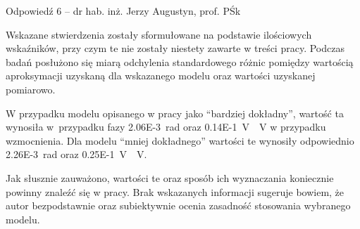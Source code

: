 \documentclass[12pt, polish, aspectratio = 169]{slides}
\begin{document}
\begin{frame}[allowframebreaks]{Odpowiedź 6 -- dr hab. inż. Jerzy Augustyn, prof. PŚk}\small
\begin{justify}
Wskazane stwierdzenia zostały sformułowane na podstawie ilościowych wskaźników, przy czym te nie zostały niestety zawarte w treści pracy. Podczas badań posłużono się miarą odchylenia standardowego różnic pomiędzy wartością aproksymacji uzyskaną dla wskazanego modelu oraz wartości uzyskanej pomiarowo.

W przypadku modelu opisanego w pracy jako \enquote{bardziej dokładny}, wartość ta wynosiła w przypadku fazy \qty{2.06E-3}{rad} oraz \qty{0.14E-1}{V \per V} w przypadku wzmocnienia. Dla modelu \enquote{mniej dokładnego} wartości te wynosiły odpowiednio \qty{2.26E-3}{rad} oraz \qty{0.25E-1}{V \per V}.

Jak słusznie zauważono, wartości te oraz sposób ich wyznaczania koniecznie powinny znaleźć się w pracy. Brak wskazanych informacji sugeruje bowiem, że autor bezpodstawnie oraz subiektywnie ocenia zasadność stosowania wybranego modelu.
\end{justify}
\end{frame}
\end{document}
